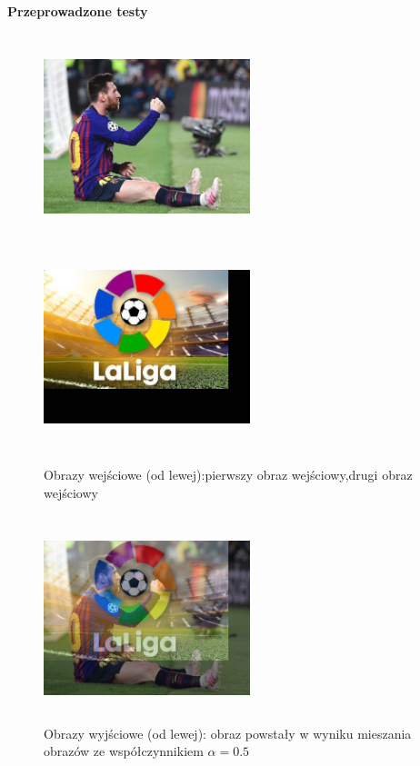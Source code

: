 \documentclass[magisterska,openany]{pracadypl}
\begin{document}
\newpage
\vspace{0.25cm}\textbf{\Large Przeprowadzone testy}
\vspace{0.5cm}
\begin{figure}[h]
\centering
\includegraphics[width=6cm, height=6cm]{2_4/ResolRGB1.jpg}
\includegraphics[width=6cm, height=6cm]{2_4/ResolRGB2.jpg}
\caption{Obrazy wejściowe (od lewej):pierwszy obraz wejściowy,drugi obraz wejściowy}
\end{figure}
\begin{figure}[h]
\centering
\includegraphics[width=6cm, height=6cm]{4_5/mixRGB1.jpg}
\caption{Obrazy wyjściowe (od lewej): obraz powstały w wyniku
mieszania obrazów ze współczynnikiem $\alpha=0.5$}
\end{figure}
\end{document}
